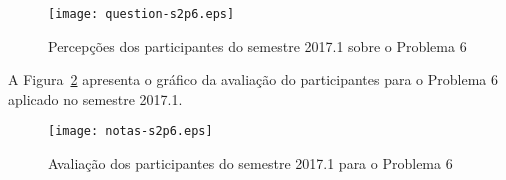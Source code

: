\begin{figure}[!htb]
\centering
\texttt{[image: question-s2p6.eps]}
\caption{Percepções dos participantes do semestre 2017.1 sobre o Problema 6}
\label{percep-s2p6}
\end{figure}

A Figura~\ref{aval-s2p6} apresenta o gráfico da
avaliação do participantes para o Problema 6 aplicado no semestre 2017.1.

\begin{figure}[!htb]
\centering
\texttt{[image: notas-s2p6.eps]}
\caption{Avaliação dos participantes do semestre 2017.1 para o Problema 6}
\label{aval-s2p6}
\end{figure}
